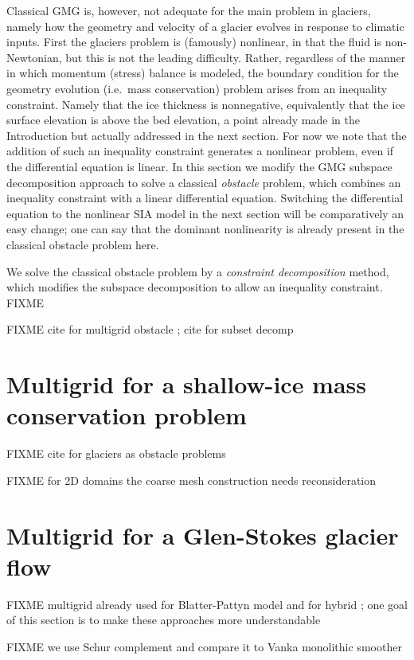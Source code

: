 \documentclass[letterpaper,final,12pt,reqno]{amsart}
\begin{document}
Classical GMG is, however, not adequate for the main problem in glaciers, namely how the geometry and velocity of a glacier evolves in response to climatic inputs.  First the glaciers problem is (famously) nonlinear, in that the fluid is non-Newtonian, but this is not the leading difficulty.  Rather, regardless of the manner in which momentum (stress) balance is modeled, the boundary condition for the geometry evolution (i.e.~mass conservation) problem arises from an inequality constraint.  Namely that the ice thickness is nonnegative, equivalently that the ice surface elevation is above the bed elevation, a point already made in the Introduction but actually addressed in the next section.  For now we note that the addition of such an inequality constraint generates a nonlinear problem, even if the differential equation is linear.  In this section we modify the GMG subspace decomposition approach to solve a classical \emph{obstacle} problem, which combines an inequality constraint with a linear differential equation.  Switching the differential equation to the nonlinear SIA model in the next section will be comparatively an easy change; one can say that the dominant nonlinearity is already present in the classical obstacle problem here.

We solve the classical obstacle problem by a \emph{constraint decomposition} \cite{Tai2003} method, which modifies the subspace decomposition to allow an inequality constraint.  FIXME

FIXME cite for multigrid obstacle \cite{BrandtCryer1983,Bueler2021,GraeserKornhuber2009,Jouvetetal2013}; cite for subset decomp \cite{Tai2003}


\section{Multigrid for a shallow-ice mass conservation problem} \label{sec:sia}

FIXME cite for glaciers as obstacle problems \cite{Bueler2016,Bueler2020,Calvoetal2002,JouvetBueler2012}

FIXME for 2D domains the coarse mesh construction needs reconsideration

\section{Multigrid for a Glen-Stokes glacier flow} \label{sec:stokes}

FIXME multigrid already used for Blatter-Pattyn model \cite{BrownSmithAhmadia2013} and for hybrid \cite{Jouvetetal2013}; one goal of this section is to make these approaches more understandable

FIXME we use Schur complement \cite{Bueler2021,Elmanetal2014} and compare it to Vanka monolithic smoother \cite{Farrelletal2019}

\small

\bigskip


\end{document}
